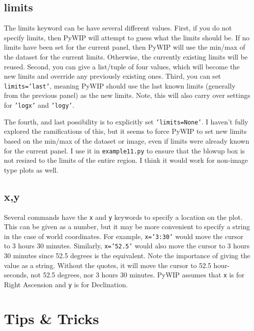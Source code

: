 \documentclass[12pt]{article}
\newcommand{\pywip}{PyWIP}
\begin{document}
\subsection{limits}

The limits keyword can be have several different values.  First, if you do not
specify limits, then \pywip{} will attempt to guess what the limits should be.
If no limits have been set for the current panel, then \pywip{} will use the 
min/max of the dataset for the current limits.  Otherwise, the currently
existing limits will be reused.  Second, you can give a list/tuple of four
values, which will become the new limits and override any previously existing
ones.  Third, you can set \texttt{limits='last'}, meaning \pywip{} should
use the last known limits (generally from the previous panel) as the new limits.
Note, this will also carry over settings for \texttt{'logx'} and 
\texttt{'logy'}.

The fourth, and last possibility is to explicitly set \texttt{'limits=None'}. I
haven't fully explored the ramifications of this, but it seems to force \pywip{}
to set new limits based on the min/max of the dataset or image, even if limits
were already known for the current panel. I use it in \texttt{example11.py} to
ensure that the blowup box is not resized to the limits of the entire region. I
think it would work for non-image type plots as well.

\subsection{x,y}

Several commands have the \texttt{x} and \texttt{y} keywords to specify a
location on the plot.  This can be given as a number, but it may be more
convenient to specify a string in the case of world coordinates.  For example,
\texttt{x='3:30'} would move the cursor to 3 hours 30 minutes.  Similarly,
\texttt{x='52.5'} would also move the cursor to 3 hours 30 minutes since 52.5
degrees is the equivalent.  Note the importance of giving the value as a string.
Without the quotes, it will move the cursor to 52.5 hour-seconds, not 52.5
degrees, nor 3 hours 30 minutes.  \pywip{} assumes that \texttt{x} is for Right
Ascension and \texttt{y} is for Declination.

\section{Tips \& Tricks}
\end{document}
